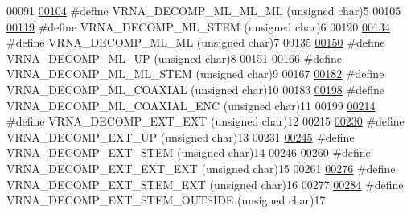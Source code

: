 \begin{DoxyCode}
00091 
\hyperlink{group__constraints_ga735517266f2e35e1374b8f1ea77ef23e}{00104} \textcolor{preprocessor}{#define VRNA\_DECOMP\_ML\_ML\_ML    (unsigned char)5}
00105 
\hyperlink{group__constraints_ga4a23054c75d8efc785de50e3ea87602f}{00119} \textcolor{preprocessor}{#define VRNA\_DECOMP\_ML\_STEM     (unsigned char)6}
00120 
\hyperlink{group__constraints_ga7f4cb9ff7a33e67f0539bd39e7b19a78}{00134} \textcolor{preprocessor}{#define VRNA\_DECOMP\_ML\_ML       (unsigned char)7}
00135 
\hyperlink{group__constraints_gae6478dda14e50e2f2cb9ef333a29256e}{00150} \textcolor{preprocessor}{#define VRNA\_DECOMP\_ML\_UP       (unsigned char)8}
00151 
\hyperlink{group__constraints_ga63d8ceb8c96ae3b463e529e28cc0fe98}{00166} \textcolor{preprocessor}{#define VRNA\_DECOMP\_ML\_ML\_STEM (unsigned char)9}
00167 
\hyperlink{group__constraints_ga4fe48d575830b16c208e280e01ab1497}{00182} \textcolor{preprocessor}{#define VRNA\_DECOMP\_ML\_COAXIAL  (unsigned char)10}
00183 
\hyperlink{group__constraints_ga0224727f7b8ad2f23eb0a3fd28d8b3fb}{00198} \textcolor{preprocessor}{#define VRNA\_DECOMP\_ML\_COAXIAL\_ENC  (unsigned char)11}
00199 
\hyperlink{group__constraints_ga437adf5115c1999304eff26b41e4c9b6}{00214} \textcolor{preprocessor}{#define VRNA\_DECOMP\_EXT\_EXT     (unsigned char)12}
00215 
\hyperlink{group__constraints_gaff1ddaffe86d984623910b40cc8a8717}{00230} \textcolor{preprocessor}{#define VRNA\_DECOMP\_EXT\_UP      (unsigned char)13}
00231 
\hyperlink{group__constraints_gae44b5ace0d9b4a29088069ecb4cec441}{00245} \textcolor{preprocessor}{#define VRNA\_DECOMP\_EXT\_STEM (unsigned char)14}
00246 
\hyperlink{group__constraints_ga803bd818b3f4b2b0a4a5cfa2f7dc2045}{00260} \textcolor{preprocessor}{#define VRNA\_DECOMP\_EXT\_EXT\_EXT (unsigned char)15}
00261 
\hyperlink{group__constraints_gabb09c5b78b75a44502fc77b950125c1e}{00276} \textcolor{preprocessor}{#define VRNA\_DECOMP\_EXT\_STEM\_EXT (unsigned char)16}
00277 
\hyperlink{group__constraints_gae7554cd3ff089360c02e4920229e221c}{00284} \textcolor{preprocessor}{#define VRNA\_DECOMP\_EXT\_STEM\_OUTSIDE (unsigned char)17}

\end{DoxyCode}

